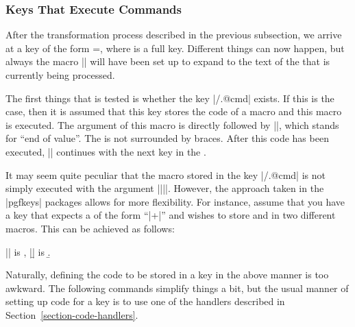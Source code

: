 \subsubsection{Keys That Execute Commands}
\label{section-key-code}

After the transformation process described in the previous subsection, we
arrive at a key of the form =, where  is a full
key. Different things can now happen, but always the macro |\pgfkeyscurrentkey|
will have been set up to expand to the text of the  that is currently
being processed.

The first things that is tested is whether the key |/.@cmd| exists.
If this is the case, then it is assumed that this key stores the code of a
macro and this macro is executed. The argument of this macro is 
directly followed by |\pgfeov|, which stands for ``end of value''. The
 is not surrounded by braces. After this code has been executed,
|\pgfkeys| continues with the next key in the .

It may seem quite peculiar that the macro stored in the key |/.@cmd|
is not simply executed with the argument |{||}|. However, the
approach taken in the |pgfkeys| packages allows for more flexibility. For
instance, assume that you have a key that expects a  of the form
``|+|'' and wishes to store  and
 in two different macros. This can be achieved as follows:
%
\begin{codeexample}[]
\def\mystore#1+#2\pgfeov{\def\a{#1}\def\b{#2}}

|\a| is \a, |\b| is \b.
\end{codeexample}

Naturally, defining the code to be stored in a key in the above manner is too
awkward. The following commands simplify things a bit, but the usual manner of
setting up code for a key is to use one of the handlers described in
Section~\ref{section-code-handlers}.


